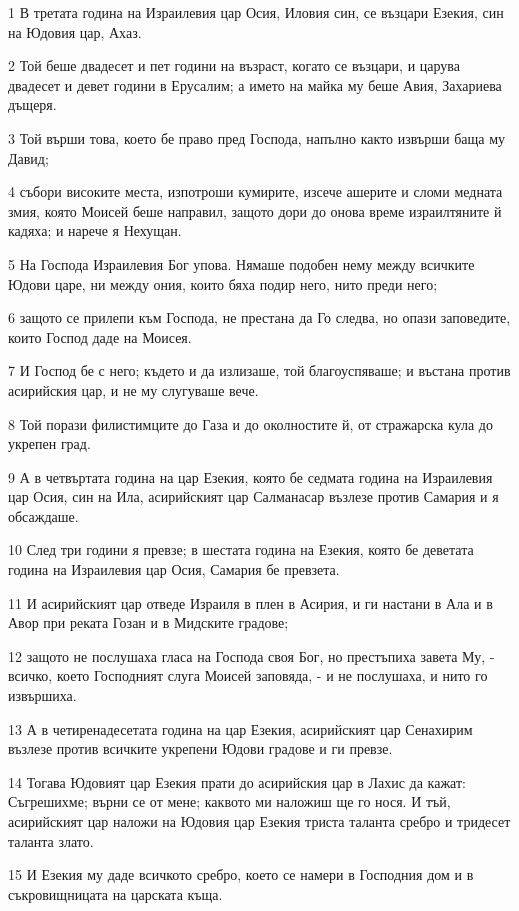 \par 1 В третата година на Израилевия цар Осия, Иловия син, се възцари Езекия, син на Юдовия цар, Ахаз.
\par 2 Той беше двадесет и пет години на възраст, когато се възцари, и царува двадесет и девет години в Ерусалим; а името на майка му беше Авия, Захариева дъщеря.
\par 3 Той върши това, което бе право пред Господа, напълно както извърши баща му Давид;
\par 4 събори високите места, изпотроши кумирите, изсече ашерите и сломи медната змия, която Моисей беше направил, защото дори до онова време израилтяните й кадяха; и нарече я Нехущан.
\par 5 На Господа Израилевия Бог упова. Нямаше подобен нему между всичките Юдови царе, ни между ония, които бяха подир него, нито преди него;
\par 6 защото се прилепи към Господа, не престана да Го следва, но опази заповедите, които Господ даде на Моисея.
\par 7 И Господ бе с него; където и да излизаше, той благоуспяваше; и въстана против асирийския цар, и не му слугуваше вече.
\par 8 Той порази филистимците до Газа и до околностите й, от стражарска кула до укрепен град.
\par 9 А в четвъртата година на цар Езекия, която бе седмата година на Израилевия цар Осия, син на Ила, асирийският цар Салманасар възлезе против Самария и я обсаждаше.
\par 10 След три години я превзе; в шестата година на Езекия, която бе деветата година на Израилевия цар Осия, Самария бе превзета.
\par 11 И асирийският цар отведе Израиля в плен в Асирия, и ги настани в Ала и в Авор при реката Гозан и в Мидските градове;
\par 12 защото не послушаха гласа на Господа своя Бог, но престъпиха завета Му, - всичко, което Господният слуга Моисей заповяда, - и не послушаха, и нито го извършиха.
\par 13 А в четиренадесетата година на цар Езекия, асирийският цар Сенахирим възлезе против всичките укрепени Юдови градове и ги превзе.
\par 14 Тогава Юдовият цар Езекия прати до асирийския цар в Лахис да кажат: Съгрешихме; върни се от мене; каквото ми наложиш ще го нося. И тъй, асирийският цар наложи на Юдовия цар Езекия триста таланта сребро и тридесет таланта злато.
\par 15 И Езекия му даде всичкото сребро, което се намери в Господния дом и в съкровищницата на царската къща.
